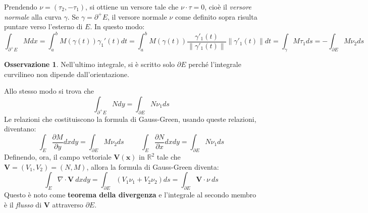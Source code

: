 \documentclass[10pt, a4paper]{scrartcl}
\theoremstyle{definition}
\numberwithin{esempio}{section}
\theoremstyle{definition}
\newtheorem{obs}{Osservazione}
\numberwithin{obs}{section}
\numberwithin{nota}{section}
\numberwithin{equation}{subsection}
\begin{document}
Prendendo $\nu = (\tau _2, -\tau _1)$, si ottiene un versore tale che $\nu \cdot \tau =0 $, cio\`e il \textit{versore normale} alla curva $\gamma$.
Se $\gamma = \partial ^+ E$, il versore normale $\nu $ come definito sopra risulta puntare verso l'esterno di $E$.
In questo modo:
\[
\int_{\partial ^+E} M dx = \int_{a} ^b M(\gamma(t)) \gamma_1'(t) dt = \int_{a} ^b M(\gamma(t)) \frac{\gamma'_1(t)}{\left\lVert \gamma'_1(t) \right\rVert }\left\lVert \gamma'_1(t) \right\rVert  dt  = \int_{\gamma} M\tau _1  ds = - \int_{\partial E} M\nu _2 ds
\] 
\begin{obs}
	Nell'ultimo integrale, si \`e scritto solo $\partial E$ perch\'e l'integrale curvilineo non dipende dall'orientazione.
\end{obs}
Allo stesso modo si trova che
\[
\int_{\partial ^+ E} N dy = \int_{\partial E} N \nu_1 ds
\] 
Le relazioni che costituiscono la formula di Gauss-Green, usando queste relazioni, diventano:
\[
\int_{E} \frac{\partial M}{\partial y} dxdy = \int_{\partial E} M\nu _2  ds \hspace{1cm}\int_{E} \frac{\partial N}{\partial x} dxdy = \int_{\partial E} N \nu _1 ds
\] 
Definendo, ora, il campo vettoriale $\mathbf{V} (\mathbf{x} )$ in $\mathbb{R}^2$ tale che $\mathbf{V} = (V_1,V_2) = (N,M)$, allora la formula di Gauss-Green diventa:
\begin{equation}
	\int_{E} \nabla \cdot \mathbf{V} \ dxdy = \int_{\partial E} (V_1 \nu _1 + V_2 \nu _2) ds = \int_{\partial E} \mathbf{V} \cdot \nu \ ds
\end{equation}
Questo \`e noto come \textbf{teorema della divergenza} e l'integrale al secondo membro \`e il \textit{flusso} di $\mathbf{V} $ attraverso $\partial E$.
\end{document}
